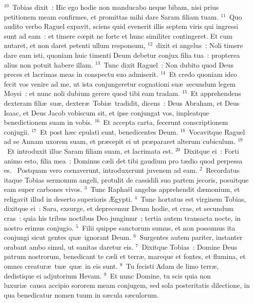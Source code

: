 ${}^{10}$~Tobias dixit~: Hic ego hodie non manducabo neque bibam, nisi prius petitionem meam confirmes, et promittas mihi dare Saram filiam tuam.
${}^{11}$~Quo audito verbo Raguel expavit, sciens quid evenerit illis septem viris qui ingressi sunt ad eam~: et timere cœpit ne forte et hunc similiter contingeret. Et cum nutaret, et non daret petenti ullum responsum,
${}^{12}$~dixit ei angelus~: Noli timere dare eam isti, quoniam huic timenti Deum debetur conjux filia tua~: propterea alius non potuit habere illam.
${}^{13}$~Tunc dixit Raguel~: Non dubito quod Deus preces et lacrimas meas in conspectu suo admiserit.
${}^{14}$~Et credo quoniam ideo fecit vos venire ad me, ut ista conjungeretur cognationi su\ae\ secundum legem Moysi~: et nunc noli dubium gerere quod tibi eam tradam.
${}^{15}$~Et apprehendens dexteram fili\ae\ su\ae , dexter\ae\ Tobi\ae\ tradidit, dicens~: Deus Abraham, et Deus Isaac, et Deus Jacob vobiscum sit, et ipse conjungat vos, impleatque benedictionem suam in vobis.
${}^{16}$~Et accepta carta, fecerunt conscriptionem conjugii.
${}^{17}$~Et post h\ae c epulati sunt, benedicentes Deum.
${}^{18}$~Vocavitque Raguel ad se Annam uxorem suam, et pr\ae cepit ei ut pr\ae pararet alterum cubiculum.
${}^{19}$~Et introduxit illuc Saram filiam suam, et lacrimata est.
${}^{20}$~Dixitque ei~: Forti animo esto, filia mea~: Dominus c\ae li det tibi gaudium pro t\ae dio quod perpessa es.
~\lettrine[lines=10,image=true,loversize=0.05,lraise=-0.03]{P}{}ostquam vero cœnaverunt, introduxerunt juvenem ad eam.
${}^{2}$~Recordatus itaque Tobias sermonum angeli, protulit de cassidili suo partem jecoris, posuitque eam super carbones vivos.
${}^{3}$~Tunc Rapha\"el angelus apprehendit d\ae monium, et religavit illud in deserto superioris \AE gypti.
${}^{4}$~Tunc hortatus est virginem Tobias, dixitque ei~: Sara, exsurge, et deprecemur Deum hodie, et cras, et secundum cras~: quia his tribus noctibus Deo jungimur~; tertia autem transacta nocte, in nostro erimus conjugio.
${}^{5}$~Filii quippe sanctorum sumus, et non possumus ita conjungi sicut gentes qu\ae\ ignorant Deum.
${}^{6}$~Surgentes autem pariter, instanter orabant ambo simul, ut sanitas daretur eis.
${}^{7}$~Dixitque Tobias~: Domine Deus patrum nostrorum, benedicant te c\ae li et terr\ae , mareque et fontes, et flumina, et omnes creatur\ae\ tu\ae\ qu\ae\ in eis sunt.
${}^{8}$~Tu fecisti Adam de limo terr\ae , dedistique ei adjutorium Hevam.
${}^{9}$~Et nunc Domine, tu scis quia non luxuri\ae\ causa accipio sororem meam conjugem, sed sola posteritatis dilectione, in qua benedicatur nomen tuum in s\ae cula s\ae culorum.
